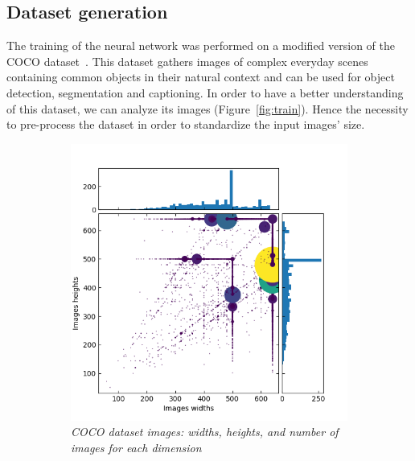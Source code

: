 \documentclass{article}
\begin{document}
    \subsection{Dataset generation}
        \label{par:coco}
        The training of the neural network was performed on a modified version of the COCO dataset~\cite{microsoft2014}. This dataset gathers images of complex everyday scenes containing common objects in their natural context and can be used for object detection, segmentation and captioning. In order to have a better understanding of this dataset, we can analyze its images (Figure~\ref{fig:train}). Hence the necessity to pre-process the dataset in order to standardize the input images' size.

        \begin{figure}[!ht]
            \begin{subfigure}{.49\linewidth}
                \centering
                \includegraphics[width=\linewidth]{pics/train2017full.png}
                \caption{\textit{COCO dataset images: widths, heights, and number of images for each dimension}}
            \end{subfigure}
            \begin{subfigure}{.49\linewidth}
                \centering
                \begin{tabular}{|c||c|c|c|}

\end{tabular}
\end{subfigure}
\end{figure}
\end{document}
